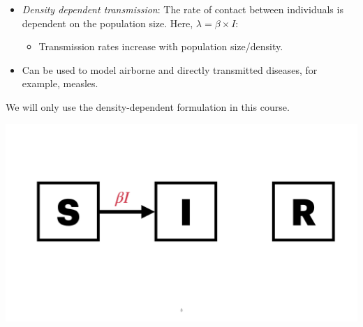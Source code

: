 \documentclass[
  ignorenonframetext,
]{beamer}
\providecommand{\tightlist}{%
  \setlength{\itemsep}{0pt}\setlength{\parskip}{0pt}}\usepackage{longtable,booktabs,array}
\begin{document}
\begin{frame}
\begin{itemize}
\tightlist
\item
  {\emph{Density dependent transmission}}: The rate of contact between
  individuals is dependent on the population size. Here,
  {\(\lambda = \beta \times I\)}:

  \begin{itemize}
  \tightlist
  \item
    Transmission rates increase with population size/density.
  \end{itemize}
\item
  Can be used to model airborne and directly transmitted diseases, for
  example, measles.
\end{itemize}

\begin{tcolorbox}[enhanced jigsaw, toprule=.15mm, opacityback=0, bottomtitle=1mm, opacitybacktitle=0.6, colframe=quarto-callout-note-color-frame, titlerule=0mm, breakable, colback=white, title=\textcolor{quarto-callout-note-color}{\faInfo}\hspace{0.5em}{Note}, left=2mm, colbacktitle=quarto-callout-note-color!10!white, arc=.35mm, coltitle=black, bottomrule=.15mm, rightrule=.15mm, leftrule=.75mm, toptitle=1mm]

We will only use the density-dependent formulation in this course.

\end{tcolorbox}
\end{frame}

\begin{frame}
\includegraphics{images/model_diagrams/model_diagrams.003.jpeg}
\end{frame}
\end{document}
